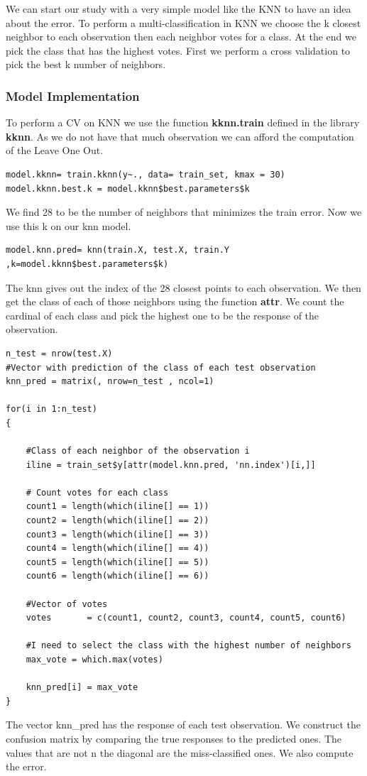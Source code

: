 \documentclass[]{report}
\begin{document}
We can start our study with a very simple model like the KNN to have an idea about the error. To perform a multi-classification in KNN we choose the k closest neighbor to each observation then each neighbor votes for a  class. At the end we pick the class that has the highest votes. 
First we perform a cross validation to pick the best k number of neighbors.

\subsubsection{Model Implementation}
To perform a CV on KNN we use the function \textbf{kknn.train} defined in the library \textbf{kknn}. As we do not have that much observation we can afford the computation of the Leave One Out.
\begin{lstlisting}
model.kknn= train.kknn(y~., data= train_set, kmax = 30)
model.kknn.best.k = model.kknn$best.parameters$k
\end{lstlisting}
We find 28 to be the number of neighbors that minimizes the train error. Now we use this k on our knn model.

\begin{lstlisting}
model.knn.pred= knn(train.X, test.X, train.Y ,k=model.kknn$best.parameters$k)
\end{lstlisting}

The knn gives out the index of the 28 closest points to each observation. We then get the class of each of those neighbors using the function\textbf{ attr}. We count the cardinal of each class and pick the highest one to be the response of the observation.
\begin{lstlisting}
n_test = nrow(test.X)
#Vector with prediction of the class of each test observation
knn_pred = matrix(, nrow=n_test , ncol=1) 

for(i in 1:n_test)
{

    #Class of each neighbor of the observation i
    iline = train_set$y[attr(model.knn.pred, 'nn.index')[i,]]

    # Count votes for each class
    count1 = length(which(iline[] == 1)) 
    count2 = length(which(iline[] == 2)) 
    count3 = length(which(iline[] == 3)) 
    count4 = length(which(iline[] == 4)) 
    count5 = length(which(iline[] == 5)) 
    count6 = length(which(iline[] == 6)) 

    #Vector of votes
    votes       = c(count1, count2, count3, count4, count5, count6)

    #I need to select the class with the highest number of neighbors
    max_vote = which.max(votes)

    knn_pred[i] = max_vote
}
\end{lstlisting}
The vector knn\_pred has the response of each test observation. We construct the confusion matrix by comparing the true responses to the predicted ones. The values that are not n the diagonal are the miss-classified ones. We also compute the error.
\end{document}
